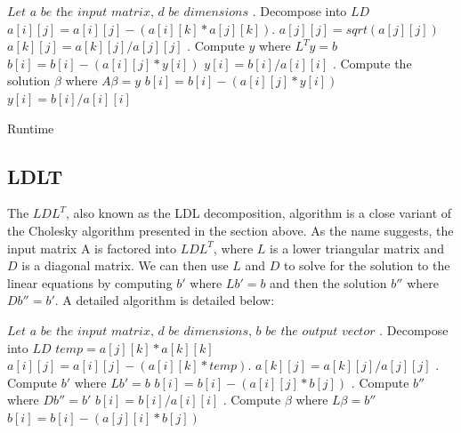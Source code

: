 \documentclass{article}
\theoremstyle{plain}
\theoremstyle{definition}
\theoremstyle{remark}
\begin{document}
\begin{algorithm}[H]
\caption{}\label{euclid}
\begin{algorithmic}[1]
\State $\textit{Let a be the input matrix, d be dimensions}$
. Decompose into $LD$
\State $a[i][j] = a[i][j] - (a[i][k] *a[j][k])$.
\EndFor
\State $a[j][j] = sqrt(a[j][j])$
\State $a[k][j] = a[k][j] / a[j][j]$
\EndFor 
\EndFor
\EndFor
{}. Compute $y$ where $L^Ty = b$
\State $b[i] = b[i] - (a[i][j] * y[i])$
\EndFor 
\State $y[i] = b[i] / a[i][i]$
\EndFor
{}. Compute the solution $\beta$ where $A\beta = y$
\State $b[i] = b[i] - (a[i][j] * y[i])$
\EndFor 
\State $y[i] = b[i] / a[i][i]$
\EndFor
\end{algorithmic}
\end{algorithm}
Runtime

\subsection{LDLT}

The $LDL^T$, also known as the LDL decomposition, algorithm is a close variant of the Cholesky algorithm presented in the section above. As the name suggests, the input matrix A is factored into $LDL^T$, where $L$ is a lower triangular matrix and $D$ is a diagonal matrix. We can then use $L$ and $D$ to solve for the solution to the linear equations by computing $b'$ where $Lb' = b$ and then the solution $b''$ where $Db'' = b'$. A detailed algorithm is detailed below: 

\begin{algorithm}[H]
\caption{}\label{euclid}
\begin{algorithmic}[1]
\State $\textit{Let a be the input matrix, d be dimensions, b be the output vector}$
. Decompose into $LD$
\State $temp = a[j][k] * a[k][k]$
\State $a[i][j] = a[i][j] - (a[i][k] *temp)$.
\EndFor
{}
\State $a[k][j] = a[k][j] / a[j][j]$
\EndFor 
\EndFor
\EndFor
{}. Compute $b'$ where $Lb'= b$
\State $b[i] = b[i] - (a[i][j] * b[j])$
\EndFor 
\EndFor
{}. Compute $b''$ where $Db'' = b'$
\State $b[i] = b[i] / a[i][i]$
\EndFor 
{}. Compute $\beta$ where $L\beta = b''$ 
\State $b[i] = b[i] - (a[j][i] * b[j])$
\EndFor 
\EndFor
\end{algorithmic}
\end{algorithm}
\end{document}
